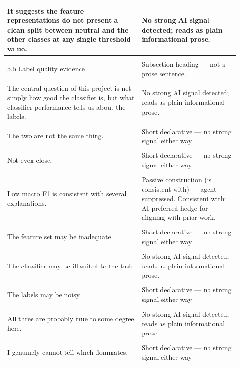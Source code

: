 \documentclass[11pt]{article}
\begin{document}
\begin{longtable}{|p{0.55\linewidth}|p{0.40\linewidth}|}
\hline
It suggests the feature representations do not present a clean split between neutral and the other classes at any single threshold value. & No strong AI signal detected; reads as plain informational prose. \\[2pt]
\hline
\rule{0pt}{3.5cm} & \\
\hline
5.5 Label quality evidence & Subsection heading --- not a prose sentence. \\[2pt]
\hline
\rule{0pt}{3.5cm} & \\
\hline
The central question of this project is not simply how good the classifier is, but what classifier performance tells us about the labels. & No strong AI signal detected; reads as plain informational prose. \\[2pt]
\hline
\rule{0pt}{3.5cm} & \\
\hline
The two are not the same thing. & Short declarative --- no strong signal either way. \\[2pt]
\hline
\rule{0pt}{3.5cm} & \\
\hline
Not even close. & Short declarative --- no strong signal either way. \\[2pt]
\hline
\rule{0pt}{3.5cm} & \\
\hline
Low macro F1 is consistent with several explanations. & Passive construction (is consistent with) --- agent suppressed. Consistent with: AI preferred hedge for aligning with prior work. \\[2pt]
\hline
\rule{0pt}{3.5cm} & \\
\hline
The feature set may be inadequate. & Short declarative --- no strong signal either way. \\[2pt]
\hline
\rule{0pt}{3.5cm} & \\
\hline
The classifier may be ill-suited to the task. & No strong AI signal detected; reads as plain informational prose. \\[2pt]
\hline
\rule{0pt}{3.5cm} & \\
\hline
The labels may be noisy. & Short declarative --- no strong signal either way. \\[2pt]
\hline
\rule{0pt}{3.5cm} & \\
\hline
All three are probably true to some degree here. & No strong AI signal detected; reads as plain informational prose. \\[2pt]
\hline
\rule{0pt}{3.5cm} & \\
\hline
I genuinely cannot tell which dominates. & Short declarative --- no strong signal either way. \\[2pt]

\end{longtable}
\end{document}
